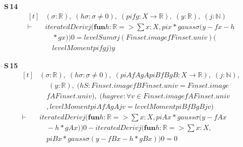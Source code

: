 \noindent\textbf{S\,14}\quad{}
{\footnotesize\[ \begin{aligned}[t]
&(\sigma : \mathbb{R} ),\; (\mathit{hσ} : \sigma \neq 0),\; (\mathit{pi} \mathit{f} \mathit{g} : \mathit{X} \to \mathbb{R} ),\; (\mathit{y} : \mathbb{R} ),\; (\mathit{j} : \mathbb{N} )\\
\vdash\;&\mathit{iteratedDeriv} \mathit{j} (\mathbf{fun} \mathit{h} : \mathbb{R} => \textstyle\sum \mathit{x} : \mathit{X}, \mathit{pi} \mathit{x} * \mathit{gauss} \sigma (\mathit{y} - \mathit{f} \mathit{x} - \mathit{h}\\
&\quad * \mathit{g} \mathit{x})) 0 = \mathit{levelSum} \sigma \mathit{j} (\mathit{Finset}.\mathit{image} \mathit{f} \mathit{Finset}.\mathit{univ}) (\\
&\quad \mathit{levelMoment} \mathit{pi} \mathit{f} \mathit{g} \mathit{j}) \mathit{y}
\end{aligned} \]}

\noindent\textbf{S\,15}\quad{}
{\footnotesize\[ \begin{aligned}[t]
&(\sigma : \mathbb{R} ),\; (\mathit{hσ} : \sigma \neq 0),\; (\mathit{piA} \mathit{fA} \mathit{gA} \mathit{piB} \mathit{fB} \mathit{gB} : \mathit{X} \to \mathbb{R} ),\; (\mathit{j} : \mathbb{N} ),\\
&\quad \; (\mathit{y} : \mathbb{R} ),\; (\mathit{hS} : \mathit{Finset}.\mathit{image} \mathit{fB} \mathit{Finset}.\mathit{univ} = \mathit{Finset}.\mathit{image}\\
&\quad \mathit{fA} \mathit{Finset}.\mathit{univ}),\; (\mathit{hagree} : \forall \mathit{v} \in \mathit{Finset}.\mathit{image} \mathit{fA} \mathit{Finset}.\mathit{univ}\\
&\quad , \mathit{levelMoment} \mathit{piA} \mathit{fA} \mathit{gA} \mathit{j} \mathit{v} = \mathit{levelMoment} \mathit{piB} \mathit{fB} \mathit{gB} \mathit{j} \mathit{v})\\
\vdash\;&\mathit{iteratedDeriv} \mathit{j} (\mathbf{fun} \mathit{h} : \mathbb{R} => \textstyle\sum \mathit{x} : \mathit{X}, \mathit{piA} \mathit{x} * \mathit{gauss} \sigma (\mathit{y} - \mathit{fA} \mathit{x}\\
&\quad - \mathit{h} * \mathit{gA} \mathit{x})) 0 - \mathit{iteratedDeriv} \mathit{j} (\mathbf{fun} \mathit{h} : \mathbb{R} => \textstyle\sum \mathit{x} : \mathit{X},\\
&\quad \mathit{piB} \mathit{x} * \mathit{gauss} \sigma (\mathit{y} - \mathit{fB} \mathit{x} - \mathit{h} * \mathit{gB} \mathit{x})) 0 = 0
\end{aligned} \]}

